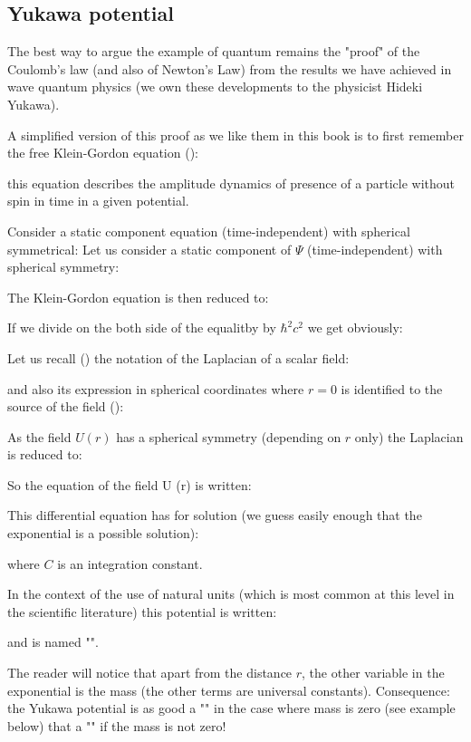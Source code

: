 	\subsection{Yukawa potential}
	The best way to argue the example of quantum remains the "proof" of the Coulomb's law (and also of Newton's Law) from the results we have achieved in wave quantum physics (we own these developments to the physicist Hideki Yukawa).

	A simplified version of this proof as we like them in this book is to first remember the free Klein-Gordon equation ():
	
	this equation describes the amplitude dynamics of presence of a particle without spin in time in a given potential.
	
	Consider a static component equation (time-independent) with spherical symmetrical:
	Let us consider a static component of $\Psi$ (time-independent) with spherical symmetry:
	
	The Klein-Gordon equation is then reduced to:
	
	If we divide on the both side of the equalitby by $\hbar^2 c^2$ we get obviously:
	
	Let us recall () the notation of the Laplacian of a scalar field:
	
	and also its expression in spherical coordinates where $r=0$ is identified to the source of the field ():
	
	As the field $U(r)$ has a spherical symmetry  (depending on $r$ only) the Laplacian is reduced to:
	
	So the equation of the field U (r) is written:
	
	This differential equation has for solution (we guess easily enough that the exponential is a possible solution):
	
	where $C$ is an integration constant.
	
	In the context of the use of natural units (which is most common at this level in the scientific literature) this potential is written:
	
	and is named "".

	The reader will notice that apart from the distance $r$, the other variable in the exponential is the mass (the other terms are universal constants). Consequence: the Yukawa potential is as good a "" in the case where mass is zero (see example below) that a "" if the mass is not zero!
	
